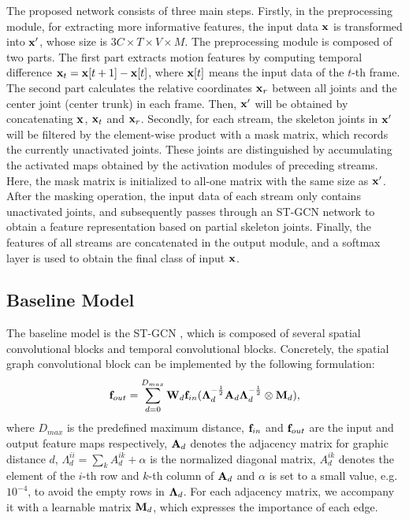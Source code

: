 \documentclass{article}
\begin{document}
The proposed network consists of three main steps. Firstly, in the preprocessing module, for extracting more informative features, the input data $\bf x$ is transformed into $\bf x'$, whose size is $3C \times T\times V\times M$. The preprocessing module is composed of two parts. The first part extracts motion features by computing temporal difference ${\bf x}_t={\bf x}[t+1]-{\bf x}[t]$, where ${\bf x}[t]$ means the input data of the $t$-th frame. The second part calculates the relative coordinates ${\bf x}_r$ between all joints and the center joint (center trunk) in each frame. Then, $\bf x'$ will be obtained by concatenating $\bf x$, ${\bf x}_t$ and ${\bf x}_r$. Secondly, for each stream, the skeleton joints in $\bf x'$ will be filtered by the element-wise product with a mask matrix, which records the currently unactivated joints. These joints are distinguished by accumulating the activated maps obtained by the activation modules of preceding streams. Here, the mask matrix is initialized to all-one matrix with the same size as $\bf x'$. After the masking operation, the input data of each stream only contains unactivated joints, and subsequently passes through an ST-GCN network \cite{Yan2018} to obtain a feature representation based on partial skeleton joints. Finally, the features of all streams are concatenated in the output module, and a softmax layer is used to obtain the final class of input $\bf x$.

\subsection{Baseline Model}
\label{ssec:baseline}

The baseline model is the ST-GCN \cite{Yan2018}, which is composed of several spatial convolutional blocks and temporal convolutional blocks. Concretely, the spatial graph convolutional block can be implemented by the following formulation:
\begin{equation}
{\bf f}_{out} = \sum_{d=0}^{D_{max}} {\bf W}_d{\bf f}_{in} ({\bf \Lambda}_d^{-\frac{1}{2}}{\bf A}_d{\bf \Lambda}_d^{-\frac{1}{2}}\otimes {\bf M}_d),
\end{equation}
where $D_{max}$ is the predefined maximum distance, ${\bf f}_{in}$ and ${\bf f}_{out}$ are the input and output feature maps respectively, ${\bf A}_d$ denotes the adjacency matrix for graphic distance $d$, $\Lambda_d^{ii} = \sum_k A_d^{ik} + \alpha$ is the normalized diagonal matrix, $A_d^{ik}$ denotes the element of the $i$-th row and $k$-th column of ${\bf A}_d$ and $\alpha$ is set to a small value, e.g. $10^{-4}$, to avoid the empty rows in ${\bf \Lambda}_d$. For each adjacency matrix, we accompany it with a learnable matrix ${\bf M}_d$, which expresses the importance of each edge.
\end{document}
